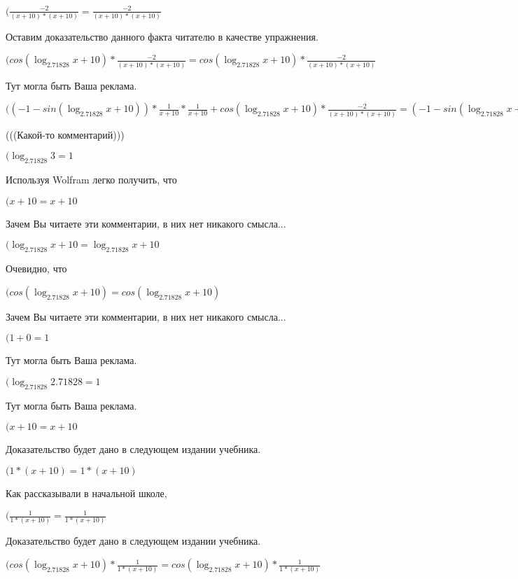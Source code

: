 \documentclass[12pt,a4paper,fleqn]{article}
\theoremstyle{definition}
\begin{document}
$(\frac{ -2 }{( x  +  10 ) * ( x  +  10 )}
 = \frac{ -2 }{( x  +  10 ) * ( x  +  10 )}
$

Оставим доказательство данного факта читателю в качестве упражнения.

$(cos(\log_{ 2.71828 }{ x  +  10 }) * \frac{ -2 }{( x  +  10 ) * ( x  +  10 )}
 = cos(\log_{ 2.71828 }{ x  +  10 }) * \frac{ -2 }{( x  +  10 ) * ( x  +  10 )}
$

Тут могла быть Ваша реклама.

$(( -1  - sin(\log_{ 2.71828 }{ x  +  10 })) * \frac{ 1 }{ x  +  10 }
 * \frac{ 1 }{ x  +  10 }
 + cos(\log_{ 2.71828 }{ x  +  10 }) * \frac{ -2 }{( x  +  10 ) * ( x  +  10 )}
 = ( -1  - sin(\log_{ 2.71828 }{ x  +  10 })) * \frac{ 1 }{ x  +  10 }
 * \frac{ 1 }{ x  +  10 }
 + cos(\log_{ 2.71828 }{ x  +  10 }) * \frac{ -2 }{( x  +  10 ) * ( x  +  10 )}
$

(((Какой-то комментарий)))

$(\log_{ 2.71828 }{ 3 } =  1 $

Используя Wolfram легко получить, что

$( x  +  10  =  x  +  10 $

Зачем Вы читаете эти комментарии, в них нет никакого смысла...

$(\log_{ 2.71828 }{ x  +  10 } = \log_{ 2.71828 }{ x  +  10 }$

Очевидно, что

$(cos(\log_{ 2.71828 }{ x  +  10 }) = cos(\log_{ 2.71828 }{ x  +  10 })$

Зачем Вы читаете эти комментарии, в них нет никакого смысла...

$( 1  +  0  =  1 $

Тут могла быть Ваша реклама.

$(\log_{ 2.71828 }{ 2.71828 } =  1 $

Тут могла быть Ваша реклама.

$( x  +  10  =  x  +  10 $

Доказательство будет дано в следующем издании учебника.

$( 1  * ( x  +  10 ) =  1  * ( x  +  10 )$

Как рассказывали в начальной школе,

$(\frac{ 1 }{ 1  * ( x  +  10 )}
 = \frac{ 1 }{ 1  * ( x  +  10 )}
$

Доказательство будет дано в следующем издании учебника.

$(cos(\log_{ 2.71828 }{ x  +  10 }) * \frac{ 1 }{ 1  * ( x  +  10 )}
 = cos(\log_{ 2.71828 }{ x  +  10 }) * \frac{ 1 }{ 1  * ( x  +  10 )}
$
\end{document}
